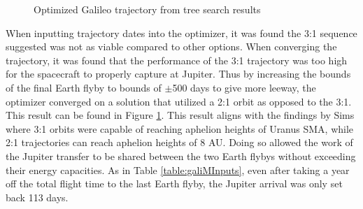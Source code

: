 \documentclass[letterpaper, preprint, paper,11pt]{AAS}	%
\newcommand*\circled[1]{\tikz[baseline=(char.base)]{
            \node[shape=circle,draw,inner sep=0.8pt] (char) {#1};}}
\begin{document}
\begin{figure}[htb]
    \centering
    \caption{Optimized Galileo trajectory from tree search results}
    \label{fig:galiMalto}
\end{figure}
\clearpage
When inputting trajectory dates into the optimizer, it was found the 3:1 sequence suggested was not as viable compared to other options. When converging the trajectory, it was found that the performance of the 3:1 trajectory was too high for the spacecraft to properly capture at Jupiter. Thus by increasing the bounds of the final Earth flyby to bounds of $\pm$500 days to give more leeway, the optimizer converged on a solution that utilized a 2:1 orbit as opposed to the 3:1. This result can be found in Figure \ref*{fig:galiMalto}. This result aligns with the findings by Sims \cite{sims1994} where 3:1 orbits were capable of reaching aphelion heights of Uranus SMA, while 2:1 trajectories can reach aphelion heights of 8 AU. Doing so allowed the work of the Jupiter transfer to be shared between the two Earth flybys without exceeding their energy capacities. As in Table \ref*{table:galiMInputs}, even after taking a year off the total flight time to the last Earth flyby, the Jupiter arrival was only set back 113 days.
\end{document}
